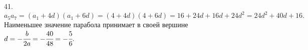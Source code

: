 41. $a_5a_7=(a_1+4d)(a_1+6d)=(4+4d)(4+6d)=16+24d+16d+24d^2=24d^2+40d+16.$ Наименьшее значение парабола принимает в своей вершине $d=-\cfrac{b}{2a}=-\cfrac{40}{48}=-\cfrac{5}{6}.$\\
